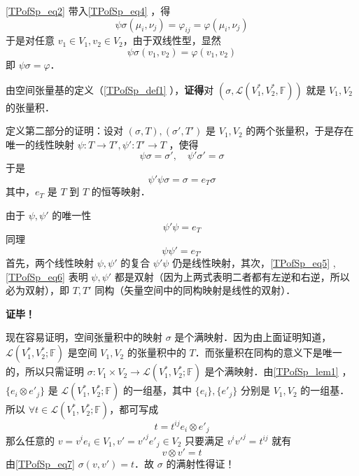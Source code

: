 \autoref{TPofSp_eq2} 带入\autoref{TPofSp_eq4}  ，得
\begin{equation}
\psi\sigma(\mu_i,\nu_j)=\varphi_{ij}=\varphi(\mu_i,\nu_j)
\end{equation}
于是对任意 $v_1\in V_1,v_2\in V_2$，由于双线性型，显然
\begin{equation}
\psi\sigma(v_1,v_2)=\varphi(v_1,v_2)
\end{equation}
即 $\psi\sigma=\varphi$．

由空间张量基的定义（\autoref{TPofSp_def1} ），\textbf{证得}对 $(\sigma,\mathcal L(V_1^*,V_2^*,\mathbb F))$ 就是 $V_1,V_2$ 的张量积．

定义第二部分的证明：设对 $(\sigma,T),(\sigma', T')$ 是 $V_1,V_2$ 的两个张量积，于是存在唯一的线性映射 $\psi:T\rightarrow T',\psi':T'\rightarrow T$ ，使得
\begin{equation}
\psi\sigma=\sigma',\quad\psi'\sigma'=\sigma
\end{equation}
于是
\begin{equation}
\psi'\psi\sigma=\sigma=e_T\sigma
\end{equation}
其中，$e_T$ 是 $T$ 到 $T$ 的恒等映射．

由于 $\psi,\psi'$ 的唯一性
\begin{equation}\label{TPofSp_eq5}
\psi'\psi=e_T
\end{equation}
同理
\begin{equation}\label{TPofSp_eq6}
\psi\psi'=e_{T'}
\end{equation}
首先，两个线性映射 $\psi,\psi'$ 的复合 $\psi'\psi$ 仍是线性映射，其次，\autoref{TPofSp_eq5} ,\autoref{TPofSp_eq6} 表明 $\psi,\psi'$ 都是双射（因为上两式表明二者都有左逆和右逆，所以必为双射），即 $T,T'$ 同构（矢量空间中的同构映射是线性的双射）．

\textbf{证毕！}

现在容易证明，空间张量积中的映射 $\sigma$ 是个满映射．因为由上面证明知道，$\mathcal L(V_1^*,V_2^*;\mathbb F)$ 是空间 $V_1,V_2$ 的张量积中的 $T$．而张量积在同构的意义下是唯一的，所以只需证明 $\sigma:V_1\times V_2\rightarrow \mathcal L(V_1^*,V_2^*;\mathbb F)$ 是个满映射．由\autoref{TPofSp_lem1} ，$\{e_i\otimes e'_j\}$ 是 $\mathcal L(V_1^*,V_2^*;\mathbb F)$ 的一组基，其中 $\{e_i\},\{e'_j\}$ 分别是 $V_1,V_2$ 的一组基．所以 $\forall t\in \mathcal L(V_1^*,V_2^*;\mathbb F)$，都可写成
\begin{equation}
t=t^{ij}e_i\otimes e'_j
\end{equation}
那么任意的 $v=v^i e_i\in V_1,v'=v'^j e'_j\in V_2$ 只要满足 $v^iv'^j=t^{ij}$ 就有
\begin{equation}
v\otimes v'=t
\end{equation}
由\autoref{TPofSp_eq7} $\sigma(v,v')=t$．故 $\sigma$ 的满射性得证！

